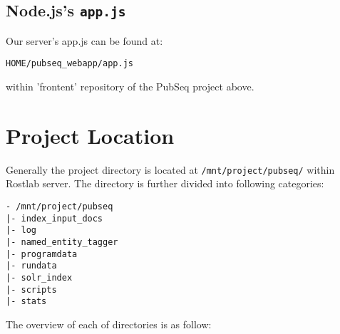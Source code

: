 \subsection{Node.js's \texttt{app.js}}

\label{sec:AppJSPath}

Our server's app.js can be found at:

\begin{center}
\texttt{HOME/pubseq\_webapp/app.js}
\end{center}

within 'frontent' repository of the PubSeq project above.


\section{Project Location}

Generally the project directory is located at \texttt{/mnt/project/pubseq/} within Rostlab server. The directory is further divided into following categories:

\begin{verbatim}
- /mnt/project/pubseq
|- index_input_docs
|- log
|- named_entity_tagger
|- programdata
|- rundata
|- solr_index
|- scripts
|- stats 
\end{verbatim}

The overview of each of directories is as follow:

